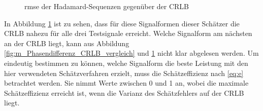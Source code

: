 \begin{figure}[htbp]
	\centering
	\caption{\gls{rmse} der Hadamard-Sequenzen gegenüber der \gls{CRLB}}
	\label{fig:Had_Phasendifferenz_CRLB_vergleich}	
\end{figure}		
		
In Abbildung \ref{fig:Had_Phasendifferenz_CRLB_vergleich} ist zu sehen, dass für diese Signalformen dieser Schätzer die \gls{CRLB} nahezu für alle drei Testsignale erreicht. Welche Signalform am nächsten an der \gls{CRLB} liegt, kann aus Abbildung \ref{fig:m_Phasendifferenz_CRLB_vergleich} und \ref{fig:Had_Phasendifferenz_CRLB_vergleich} nicht klar abgelesen werden. Um eindeutig bestimmen zu können, welche Signalform die beste Leistung mit den hier verwendeten Schätzverfahren erzielt, muss die Schätzeffizienz nach \eqref{eq:e} betrachtet werden. Sie nimmt Werte zwischen 0 und 1 an, wobei die maximale Schätzeffizienz erreicht ist, wenn die Varianz des Schätzfehlers auf der \gls{CRLB} liegt. 

